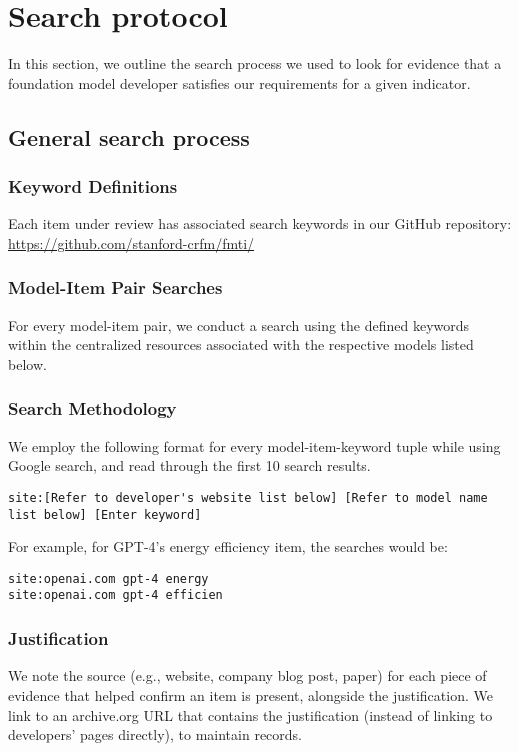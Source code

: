\hypertarget{search-protocol}{\section{Search protocol}}
\label{app:search-protocol}

In this section, we outline the search process we used to look for evidence that a foundation model developer satisfies our requirements for a given indicator. 

\subsection{General search process}

\subsubsection{Keyword Definitions}
Each item under review has associated search keywords in our GitHub repository: \url{https://github.com/stanford-crfm/fmti/}

\subsubsection{Model-Item Pair Searches}
For every model-item pair, we conduct a search using the defined keywords within the centralized resources associated with the respective models listed below.

\subsubsection{Search Methodology}
We employ the following format for every model-item-keyword tuple while using Google search, and read through the first 10 search results.

\begin{lstlisting}[breaklines=true]
site:[Refer to developer's website list below] [Refer to model name list below] [Enter keyword]
\end{lstlisting}


\noindent
For example, for GPT-4's energy efficiency item, the searches would be:

\begin{lstlisting}
site:openai.com gpt-4 energy
site:openai.com gpt-4 efficien 
\end{lstlisting}

\subsubsection{Justification}
We note the source (e.g., website, company blog post, paper) for each piece of evidence that helped confirm an item is present, alongside the justification. We link to an archive.org URL that contains the justification (instead of linking to developers’ pages directly), to maintain records.

